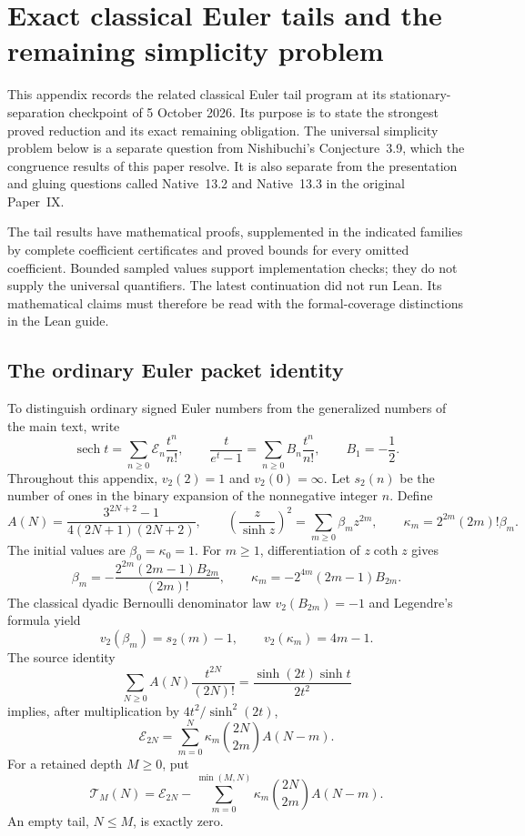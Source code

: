 \section{Exact classical Euler tails and the remaining simplicity problem}
\label{app:root:scope}

This appendix records the related classical Euler tail program at its
stationary-separation checkpoint of 5 October 2026. Its purpose is to state
the strongest proved reduction and its exact remaining obligation. The
universal simplicity problem below is a separate question from
Nishibuchi's Conjecture~3.9, which the congruence results of this paper
resolve. It is also separate from the presentation and gluing questions
called Native~13.2 and Native~13.3 in the original Paper~IX.

The tail results have mathematical proofs, supplemented in the indicated
families by complete coefficient certificates and proved bounds for every
omitted coefficient. Bounded sampled values support implementation checks;
they do not supply the universal quantifiers. The latest continuation did
not run Lean. Its mathematical claims must therefore be read with the
formal-coverage distinctions in the Lean guide.

\subsection{The ordinary Euler packet identity}
\label{app:root:identity}

To distinguish ordinary signed Euler numbers from the generalized numbers
of the main text, write
\[
 \operatorname{sech}t=\sum_{n\ge0}\mathcal E_n\frac{t^n}{n!},
 \qquad \frac{t}{e^t-1}=\sum_{n\ge0}B_n\frac{t^n}{n!},
 \qquad B_1=-\frac12.
\]
Throughout this appendix, $v_2(2)=1$ and $v_2(0)=\infty$.
Let $s_2(n)$ be the number of ones in the binary expansion of the
nonnegative integer $n$. Define
\[
 A(N)=\frac{3^{2N+2}-1}{4(2N+1)(2N+2)},\qquad
 \left(\frac z{\sinh z}\right)^2=\sum_{m\ge0}\beta_m z^{2m},
 \qquad \kappa_m=2^{2m}(2m)!\beta_m.
\]
The initial values are $\beta_0=\kappa_0=1$. For $m\ge1$, differentiation
of $z\coth z$ gives
\begin{equation}
 \beta_m=-\frac{2^{2m}(2m-1)B_{2m}}{(2m)!},\qquad
 \kappa_m=-2^{4m}(2m-1)B_{2m}.
 \label{eq:root:beta}
\end{equation}
The classical dyadic Bernoulli denominator law
$v_2(B_{2m})=-1$ and Legendre's formula yield
\begin{equation}
 v_2(\beta_m)=s_2(m)-1,\qquad
 v_2(\kappa_m)=4m-1.\label{eq:root:weights}
\end{equation}
The source identity
\[
 \sum_{N\ge0}A(N)\frac{t^{2N}}{(2N)!}
 =\frac{\sinh(2t)\sinh t}{2t^2}
\]
implies, after multiplication by $4t^2/\sinh^2(2t)$,
\begin{equation}
 \mathcal E_{2N}=\sum_{m=0}^N
    \kappa_m\binom{2N}{2m}A(N-m).
 \label{eq:root:packet}
\end{equation}
For a retained depth $M\ge0$, put
\[
 \mathcal T_M(N)=\mathcal E_{2N}
   -\sum_{m=0}^{\min(M,N)}\kappa_m\binom{2N}{2m}A(N-m).
\]
An empty tail, $N\le M$, is exactly zero.


